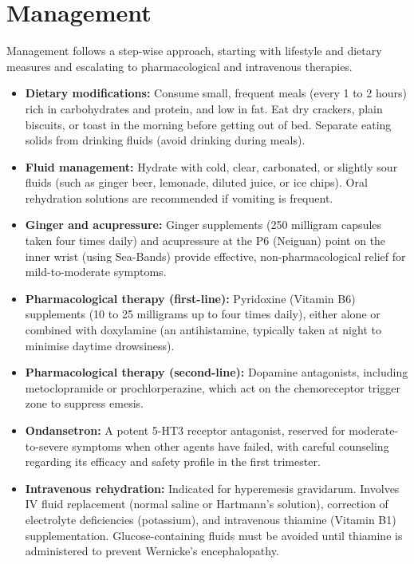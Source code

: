 \section*{Management}
Management follows a step-wise approach, starting with lifestyle and dietary measures and escalating to pharmacological and intravenous therapies.
\begin{itemize}
    \item \textbf{Dietary modifications:} Consume small, frequent meals (every 1 to 2 hours) rich in carbohydrates and protein, and low in fat. Eat dry crackers, plain biscuits, or toast in the morning before getting out of bed. Separate eating solids from drinking fluids (avoid drinking during meals).
    \item \textbf{Fluid management:} Hydrate with cold, clear, carbonated, or slightly sour fluids (such as ginger beer, lemonade, diluted juice, or ice chips). Oral rehydration solutions are recommended if vomiting is frequent.
    \item \textbf{Ginger and acupressure:} Ginger supplements (250 milligram capsules taken four times daily) and acupressure at the P6 (Neiguan) point on the inner wrist (using Sea-Bands) provide effective, non-pharmacological relief for mild-to-moderate symptoms.
    \item \textbf{Pharmacological therapy (first-line):} Pyridoxine (Vitamin B6) supplements (10 to 25 milligrams up to four times daily), either alone or combined with doxylamine (an antihistamine, typically taken at night to minimise daytime drowsiness).
    \item \textbf{Pharmacological therapy (second-line):} Dopamine antagonists, including metoclopramide or prochlorperazine, which act on the chemoreceptor trigger zone to suppress emesis.
    \item \textbf{Ondansetron:} A potent 5-HT3 receptor antagonist, reserved for moderate-to-severe symptoms when other agents have failed, with careful counseling regarding its efficacy and safety profile in the first trimester.
    \item \textbf{Intravenous rehydration:} Indicated for hyperemesis gravidarum. Involves IV fluid replacement (normal saline or Hartmann's solution), correction of electrolyte deficiencies (potassium), and intravenous thiamine (Vitamin B1) supplementation. Glucose-containing fluids must be avoided until thiamine is administered to prevent Wernicke's encephalopathy.
\end{itemize}

